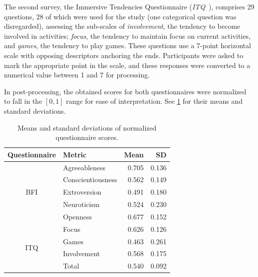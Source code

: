 The second survey, the Immersive Tendencies Questionnaire (\emph{ITQ}~\cite{witmer1998:itq}), comprises 29 questions, 28 of which were used for the study (one categorical question was disregarded), assessing the sub-scales of \emph{involvement}, the tendency to become involved in activities; \emph{focus}, the tendency to maintain focus on current activities, and \emph{games}, the tendency to play games.
These questions use a 7-point horizontal scale  with opposing descriptors anchoring  the ends.
Participants were asked to mark the appropriate point in the scale, and these responses were converted to a numerical value between 1 and 7 for processing. 

In post-processing, the obtained scores for both questionnaires were normalized to fall in the \( [0, 1] \) range for ease of interpretation. 
See \cref{tab:qscores} for their means and standard deviations.

\begin{table}[h]
  \centering
  \caption{Means and standard deviations of normalized questionnaire scores.}\label{tab:qscores}
  \setlength{\tabcolsep}{0pt} 
  \begin{tabular*}{\columnwidth}{@{\extracolsep{\fill}\quad}clrr@{}}
    \toprule
    \textbf{Questionnaire} & \textbf{Metric} & \textbf{Mean} & \textbf{SD}\\
    \midrule
    \multirow{5}{*}{BFI} 
        & Agreeableness &               0.705 &                  0.136 \\
        & Conscientiousness &               0.562 &                  0.149 \\
        & Extroversion &               0.491 &                  0.180 \\
        & Neuroticism &               0.524 &                  0.230 \\
        & Openness &               0.677 &                  0.152 \\
    \cline{1-4}
    \multirow{4}{*}{ITQ} 
        & Focus &               0.626 &                  0.126 \\
        & Games &               0.463 &                  0.261 \\
        & Involvement &               0.568 &                  0.175 \\
        & Total &               0.540 &                  0.092 \\
    \bottomrule
  \end{tabular*}
\end{table}


